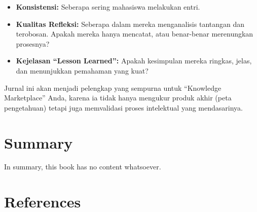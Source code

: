 \documentclass[
  letterpaper,
  DIV=11,
  numbers=noendperiod]{scrreprt}
\newlength{\cslhangindent}
\newenvironment{CSLReferences}[2] %
 {\begin{list}{}{%
  \setlength{\itemindent}{0pt}
  \setlength{\leftmargin}{0pt}
  \setlength{\parsep}{0pt}
  \ifodd #1
   \setlength{\leftmargin}{\cslhangindent}
   \setlength{\itemindent}{-1\cslhangindent}
  \fi
  \setlength{\itemsep}{#2\baselineskip}}}
 {\end{list}}
\begin{document}
\begin{itemize}
\item
  \textbf{Konsistensi:} Seberapa sering mahasiswa melakukan entri.
\item
  \textbf{Kualitas Refleksi:} Seberapa dalam mereka menganalisis
  tantangan dan terobosan. Apakah mereka hanya mencatat, atau
  benar-benar merenungkan prosesnya?
\item
  \textbf{Kejelasan ``Lesson Learned'':} Apakah kesimpulan mereka
  ringkas, jelas, dan menunjukkan pemahaman yang kuat?
\end{itemize}

Jurnal ini akan menjadi pelengkap yang sempurna untuk ``Knowledge
Marketplace'' Anda, karena ia tidak hanya mengukur produk akhir (peta
pengetahuan) tetapi juga memvalidasi proses intelektual yang
mendasarinya.


\chapter{Summary}\label{summary}

In summary, this book has no content whatsoever.


\chapter*{References}\label{references}


\label{refs}
\begin{CSLReferences}{0}{1}
\end{CSLReferences}
\end{document}
